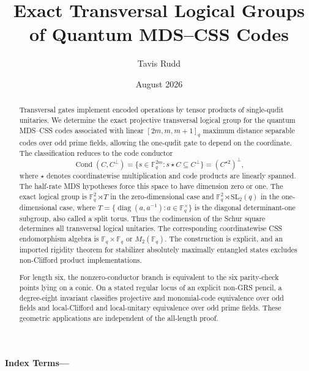 \documentclass[11pt]{article}
\title{Exact Transversal Logical Groups of Quantum MDS--CSS Codes}
\author{Tavis Rudd}
\date{August 2026}
\numberwithin{equation}{section}
\theoremstyle{upright}
\theoremstyle{definition}
\theoremstyle{remark}
\newcommand{\F}{\mathbb F}
\newcommand{\diag}{\operatorname{diag}}
\newcommand{\Cond}{\operatorname{Cond}}
\begin{document}
\maketitle

\begin{abstract}
Transversal gates implement encoded operations by tensor products of
single-qudit unitaries.  We determine the exact projective transversal
logical group for the quantum MDS--CSS codes associated with linear
\([2m,m,m+1]_q\) maximum distance separable codes over odd prime fields,
allowing the one-qudit gate to depend on the coordinate.  The classification
reduces to the code conductor
\[
 \Cond(C,C^\perp)
 =\{s\in\F_q^{2m}:s\star C\subseteq C^\perp\}
 =(C^{\star2})^\perp,
\]
where \(\star\) denotes coordinatewise multiplication and code products are
linearly spanned.  The half-rate MDS hypotheses force this space to have
dimension zero or one.  The exact
logical group is \(\F_q^2\rtimes T\) in the zero-dimensional case and
\(\F_q^2\rtimes\mathrm{SL}_2(q)\) in the one-dimensional case, where
\(T=\{\diag(a,a^{-1}):a\in\F_q^\times\}\) is the diagonal
determinant-one subgroup, also called a split torus.  Thus the codimension of
the Schur square determines
all transversal logical unitaries.  The corresponding coordinatewise CSS
endomorphism algebra is \(\F_q\times\F_q\) or \(M_2(\F_q)\).  The
construction is explicit, and an imported rigidity theorem for stabilizer
absolutely maximally entangled states excludes non-Clifford product
implementations.

For length six, the nonzero-conductor branch is equivalent to the six
parity-check points lying on a conic.  On a stated regular locus of an explicit
non-GRS pencil, a degree-eight invariant classifies projective and monomial-code
equivalence over odd fields and local-Clifford and local-unitary equivalence
over odd prime fields.  These geometric applications are independent of the
all-length proof.
\end{abstract}
\noindent\textbf{Index Terms---}








\appendix







\end{document}

